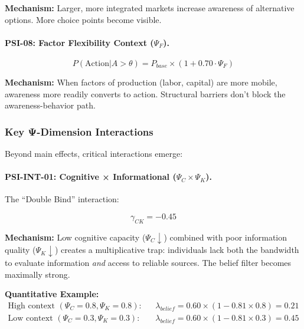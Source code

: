 \textbf{Mechanism:} Larger, more integrated markets increase awareness of alternative options. More choice points become visible.

\paragraph{PSI-08: Factor Flexibility Context ($\Psi_F$).}

\begin{equation}
P(\text{Action} | A > \theta) = P_{base} \times (1 + 0.70 \cdot \Psi_F)
\end{equation}

\textbf{Mechanism:} When factors of production (labor, capital) are more mobile, awareness more readily converts to action. Structural barriers don't block the awareness-behavior path.

\subsubsection{Key Ψ-Dimension Interactions}

Beyond main effects, critical interactions emerge:

\paragraph{PSI-INT-01: Cognitive × Informational ($\Psi_C \times \Psi_K$).}

The ``Double Bind'' interaction:

\begin{equation}
\gamma_{CK} = -0.45
\end{equation}

\textbf{Mechanism:} Low cognitive capacity ($\Psi_C \downarrow$) combined with poor information quality ($\Psi_K \downarrow$) creates a multiplicative trap: individuals lack both the bandwidth to evaluate information \emph{and} access to reliable sources. The belief filter becomes maximally strong.

\textbf{Quantitative Example:}
\begin{align}
\text{High context } (\Psi_C = 0.8, \Psi_K = 0.8): \quad &\lambda_{belief} = 0.60 \times (1 - 0.81 \times 0.8) = 0.21 \\
\text{Low context } (\Psi_C = 0.3, \Psi_K = 0.3): \quad &\lambda_{belief} = 0.60 \times (1 - 0.81 \times 0.3) = 0.45
\end{align}

